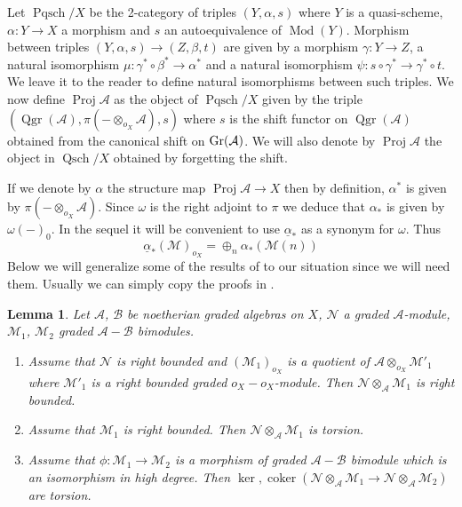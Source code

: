 \documentclass{amsproc}
\def\Ascr{{\mathcal A}}
\def\Bscr{{\mathcal B}}
\def\Mscr{{\mathcal M}}
\def\Nscr{{\mathcal N}}
\def\Gr{\mathop{\text{Gr}}}
\def\ox{{o_X}}
\def\coker{\operatorname {coker}}
\def\ker{\operatorname {ker}}
\def\Pqsch{\operatorname {Pqsch}}
\def\Qsch{\operatorname {Qsch}}
\def\Proj{\operatorname {Proj}}
\def\Qgr{\operatorname {Qgr}}
\def\Qch{\operatorname {Mod}}
\def\r{\rightarrow}
\let\oldtext\text
\def\text#1{\oldtext{\upshape #1}}
\newtheorem{lemmas}{Lemma}[subsection]
\theoremstyle{definition}
\theoremstyle{remark}
\numberwithin{equation}{section}
\numberwithin{table}{section}
\numberwithin{figure}{section}
\def\Gr{\mathop{\text{Gr}}}
\begin{document}
Let $\Pqsch/X$ be the 2-category of triples $(Y,\alpha,s)$ where $Y$
is a quasi-scheme, $\alpha:Y\r X$  a morphism  and $s$ an
autoequivalence of $\Qch(Y)$.  Morphism between triples
$(Y,\alpha,s)\r (Z,\beta,t)$ are given by a morphism $\gamma:Y\r Z$, a
natural isomorphism $\mu:\gamma^\ast\circ\beta^\ast\r\alpha^\ast$
and a natural isomorphism $\psi:s\circ\gamma^\ast\r \gamma^\ast\circ
t$. We leave it to the reader to define natural isomorphisms between
such triples. 
We now define $\Proj \Ascr$ as the object of $\Pqsch/X$ given by the
triple $(\Qgr(\Ascr),\pi(-\otimes_\ox\Ascr),s)$ where $s$ is the shift
functor on $\Qgr(\Ascr)$ obtained from the canonical shift on
$\Gr(\Ascr)$. We will also denote by $\Proj\Ascr$ the object in $\Qsch/X$
obtained by forgetting the shift.

If we denote by $\alpha$ the structure map $\Proj\Ascr\r X$ then by definition,
$\alpha^\ast$ is given by $\pi(-\otimes_\ox\Ascr)$. Since $\omega$ is
the right adjoint to $\pi$ we deduce that $\alpha_\ast$ is given by
$\omega(-)_0$. In the sequel it will be convenient to use
$\underline{\alpha}_\ast$ as a synonym for $\omega$. Thus
\[
\underline{\alpha}_\ast(\Mscr)_\ox=\oplus_n \alpha_\ast(\Mscr(n))
\]
Below we will generalize some of the
results of \cite{AZ} to our situation since we will need
them. Usually we can simply copy the proofs in \cite{AZ}.
\begin{lemmas}
\label{ref:3.8.1a}
Let $\Ascr$, $\Bscr$ be noetherian graded algebras on $X$, $\Nscr$ a graded
$\Ascr$-module, $\Mscr_1$, $\Mscr_2$ graded $\Ascr-\Bscr$ bimodules.
\begin{enumerate}
\item Assume that $\Nscr$ is right bounded and $(\Mscr_1)_{o_X}$ is a quotient
  of $\Ascr\otimes_\ox\Mscr'_1$ where $\Mscr'_1$ is a right bounded
graded $\ox-\ox$-module. Then $\Nscr\otimes_\Ascr\Mscr_1$ is
right bounded.
\item Assume that $\Mscr_1$ is right bounded. Then
  $\Nscr\otimes_\Ascr\Mscr_1$ is torsion.
\item Assume that $\phi:\Mscr_1\r\Mscr_2$ is a morphism of graded
  $\Ascr-\Bscr$ bimodule which is an isomorphism in high degree. Then 
$\ker,\coker(\Nscr\otimes_\Ascr\Mscr_1\r\Nscr\otimes_\Ascr\Mscr_2)$ are
torsion.
\end{enumerate}
\end{lemmas}
\end{document}
